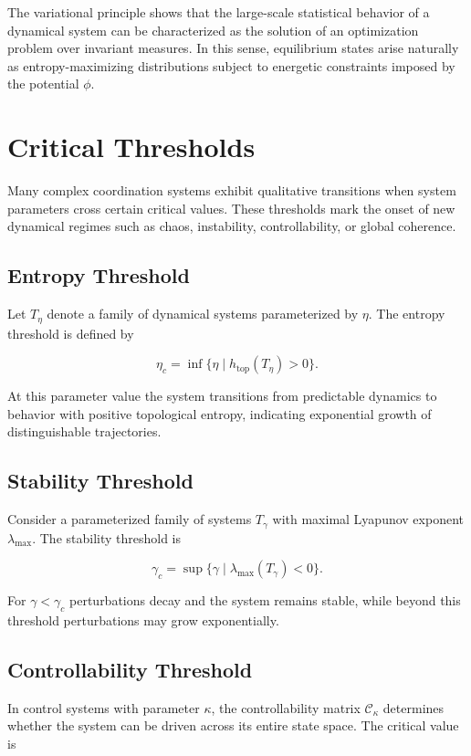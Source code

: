 \documentclass[12pt]{article}
\begin{document}
The variational principle shows that the large-scale statistical behavior of a dynamical system can be characterized as the solution of an optimization problem over invariant measures. In this sense, equilibrium states arise naturally as entropy-maximizing distributions subject to energetic constraints imposed by the potential $\phi$.

\section{Critical Thresholds}

Many complex coordination systems exhibit qualitative transitions when system parameters cross certain critical values. These thresholds mark the onset of new dynamical regimes such as chaos, instability, controllability, or global coherence.

\subsection{Entropy Threshold}

Let $T_\eta$ denote a family of dynamical systems parameterized by $\eta$. The entropy threshold is defined by

\[
\eta_c = \inf \{\eta \mid h_{\mathrm{top}}(T_\eta) > 0\}.
\]

At this parameter value the system transitions from predictable dynamics to behavior with positive topological entropy, indicating exponential growth of distinguishable trajectories.

\subsection{Stability Threshold}

Consider a parameterized family of systems $T_\gamma$ with maximal Lyapunov exponent $\lambda_{\max}$. The stability threshold is

\[
\gamma_c = \sup \{\gamma \mid \lambda_{\max}(T_\gamma) < 0\}.
\]

For $\gamma < \gamma_c$ perturbations decay and the system remains stable, while beyond this threshold perturbations may grow exponentially.

\subsection{Controllability Threshold}

In control systems with parameter $\kappa$, the controllability matrix $\mathcal{C}_\kappa$ determines whether the system can be driven across its entire state space. The critical value is
\end{document}
